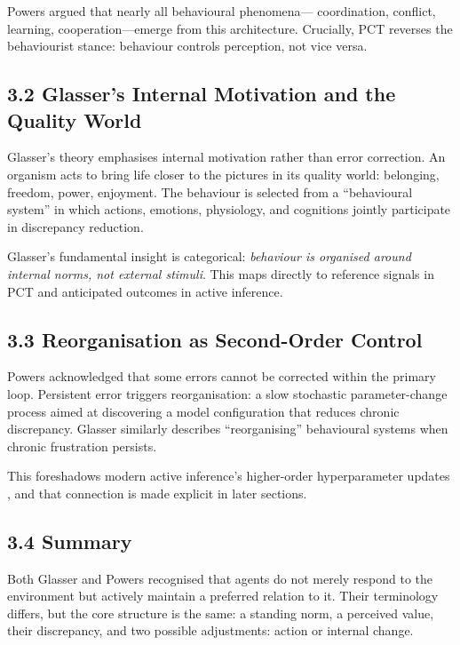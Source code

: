\documentclass[11pt,a4paper,twoside]{article}
\begin{document}
\vspace{1em}

Powers argued that nearly all behavioural phenomena—
coordination, conflict, learning, cooperation—emerge from this architecture.
Crucially, PCT reverses the behaviourist stance:
behaviour controls perception, not vice versa.

\subsection*{3.2 Glasser’s Internal Motivation and the Quality World}

Glasser’s theory emphasises internal motivation rather than error correction.
An organism acts to bring life closer to the pictures in its quality world:
belonging, freedom, power, enjoyment.
The behaviour is selected from a ``behavioural system'' in which actions, emotions,
physiology, and cognitions jointly participate in discrepancy reduction.

Glasser’s fundamental insight is categorical:
\emph{behaviour is organised around internal norms, not external stimuli}.
This maps directly to reference signals in PCT and anticipated outcomes in active inference.

\subsection*{3.3 Reorganisation as Second-Order Control}

Powers acknowledged that some errors cannot be corrected within the primary loop.
Persistent error triggers reorganisation:
a slow stochastic parameter-change process aimed at discovering a model configuration
that reduces chronic discrepancy.
Glasser similarly describes ``reorganising'' behavioural systems when chronic frustration persists.

This foreshadows modern active inference’s higher-order hyperparameter updates
\cite{friston2016deep,friston2017}, and that connection is made explicit in later sections.

\subsection*{3.4 Summary}

Both Glasser and Powers recognised that agents do not merely respond to the environment
but actively maintain a preferred relation to it.
Their terminology differs, but the core structure is the same:
a standing norm, a perceived value, their discrepancy, and two possible adjustments:
action or internal change.
\end{document}
